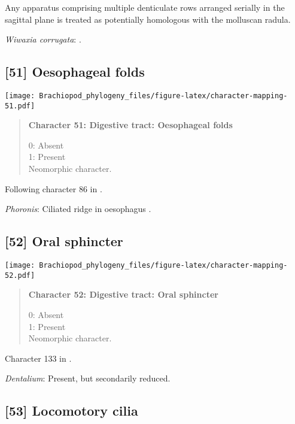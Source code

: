 \documentclass[openany]{book}
\theoremstyle{definition}
\theoremstyle{definition}
\theoremstyle{definition}
\theoremstyle{remark}
\begin{document}
Any apparatus comprising multiple denticulate rows arranged serially in
the sagittal plane is treated as potentially homologous with the
molluscan radula.

\hypertarget{Wiwaxia_corrugata-coding-50}{}
\emph{Wiwaxia corrugata}: \citet{Smith2012M}.

\subsection*{{[}51{]} Oesophageal folds}\label{oesophageal-folds}

\texttt{[image: Brachiopod\_phylogeny\_files/figure-latex/character-mapping-51.pdf]}

\begin{quote}
\textbf{Character 51: Digestive tract: Oesophageal folds}

0: Absent\\
1: Present\\
Neomorphic character.
\end{quote}

Following character 86 in \citet{Giribet2002}.

\hypertarget{Phoronis-coding-51}{}
\emph{Phoronis}: Ciliated ridge in oesophagus \citep{Torrey1901}.

\subsection*{{[}52{]} Oral sphincter}\label{oral-sphincter}

\texttt{[image: Brachiopod\_phylogeny\_files/figure-latex/character-mapping-52.pdf]}

\begin{quote}
\textbf{Character 52: Digestive tract: Oral sphincter}

0: Absent\\
1: Present\\
Neomorphic character.
\end{quote}

Character 133 in \citet{Grobe2007}.

\hypertarget{Dentalium-coding-52}{}
\emph{Dentalium}: Present, but secondarily reduced.

\subsection*{{[}53{]} Locomotory cilia}\label{locomotory-cilia}
\end{document}

